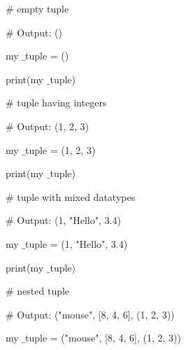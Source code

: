 \documentclass[a4paper,12pt]{report}
\begin{document}
\vspace{20pt}
\vspace{20pt}
\noindent 
{\fontsize{14pt}{14pt}\selectfont  $  \#  $ empty tuple \\} \par
\noindent 
{\fontsize{14pt}{14pt}\selectfont  $  \#  $ Output: () \\} \par
\noindent 
{\fontsize{14pt}{14pt}\selectfont my $  \_  $tuple = () \\} \par
\noindent 
{\fontsize{14pt}{14pt}\selectfont print(my $  \_  $tuple) \\} \par
\vspace{14pt}
\noindent 
{\fontsize{14pt}{14pt}\selectfont  $  \#  $ tuple having integers \\} \par
\noindent 
{\fontsize{14pt}{14pt}\selectfont  $  \#  $ Output: (1, 2, 3) \\} \par
\noindent 
{\fontsize{14pt}{14pt}\selectfont my $  \_  $tuple = (1, 2, 3) \\} \par
\noindent 
{\fontsize{14pt}{14pt}\selectfont print(my $  \_  $tuple) \\} \par
\vspace{14pt}
\noindent 
{\fontsize{14pt}{14pt}\selectfont  $  \#  $ tuple with mixed datatypes \\} \par
\noindent 
{\fontsize{14pt}{14pt}\selectfont  $  \#  $ Output: (1, "Hello", 3.4) \\} \par
\noindent 
{\fontsize{14pt}{14pt}\selectfont my $  \_  $tuple = (1, "Hello", 3.4) \\} \par
\noindent 
{\fontsize{14pt}{14pt}\selectfont print(my $  \_  $tuple) \\} \par
\vspace{14pt}
\noindent 
{\fontsize{14pt}{14pt}\selectfont  $  \#  $ nested tuple \\} \par
\noindent 
{\fontsize{14pt}{14pt}\selectfont  $  \#  $ Output: ("mouse", [8, 4, 6], (1, 2, 3)) \\} \par
\noindent 
{\fontsize{14pt}{14pt}\selectfont my $  \_  $tuple = ("mouse", [8, 4, 6], (1, 2, 3)) \\} \par
\end{document}
